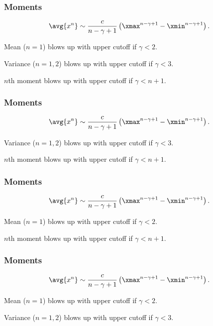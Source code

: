 \begin{frame}
  \frametitle{Moments}

$$ \avg{x^n} \sim \frac{c}{n-\gamma+1} \left( \xmax^{n-\gamma+1} - \xmin^{n-\gamma+1} \right). $$

\inv

Mean ($n=1$) blows up with upper cutoff if $\gamma < 2$.

Variance ($n=1,2$) blows up with upper cutoff if $\gamma < 3$.

$n$th moment blows up with upper cutoff if $\gamma < n + 1$.

\end{frame}

\begin{frame}
  \frametitle{Moments}

$$ \avg{x^n} \sim \frac{c}{n-\gamma+1} \left( \xmax^{n-\gamma+1} - \xmin^{n-\gamma+1} \right). $$


\inv

Variance ($n=1,2$) blows up with upper cutoff if $\gamma < 3$.

$n$th moment blows up with upper cutoff if $\gamma < n + 1$.

\end{frame}

\begin{frame}
  \frametitle{Moments}

$$ \avg{x^n} \sim \frac{c}{n-\gamma+1} \left( \xmax^{n-\gamma+1} - \xmin^{n-\gamma+1} \right). $$

Mean ($n=1$) blows up with upper cutoff if $\gamma < 2$.


\inv

$n$th moment blows up with upper cutoff if $\gamma < n + 1$.

\end{frame}

\begin{frame}
  \frametitle{Moments}

$$ \avg{x^n} \sim \frac{c}{n-\gamma+1} \left( \xmax^{n-\gamma+1} - \xmin^{n-\gamma+1} \right). $$

Mean ($n=1$) blows up with upper cutoff if $\gamma < 2$.

Variance ($n=1,2$) blows up with upper cutoff if $\gamma < 3$.


\end{frame}


